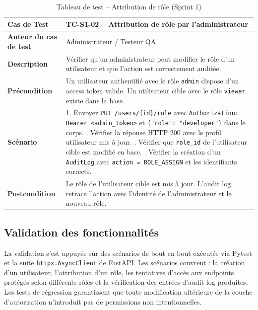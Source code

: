 \begin{table}[H]
\centering
\caption{Tableau de test -- Attribution de rôle (Sprint 1)}
\label{tab:test-sprint1-rbac}
\small
\renewcommand{\arraystretch}{1.3}
\begin{tabularx}{\textwidth}{>{\bfseries}p{3.5cm} X}
\hline
Cas de Test & TC-S1-02 -- Attribution de rôle par l'administrateur \\
\hline
Auteur du cas de test & Administrateur / Testeur QA \\
\hline
Description & Vérifier qu'un administrateur peut modifier le rôle d'un utilisateur et que l'action est correctement auditée. \\
\hline
Précondition & Un utilisateur authentifié avec le rôle \texttt{admin} dispose d'un access token valide. Un utilisateur cible avec le rôle \texttt{viewer} existe dans la base. \\
\hline
Scénario &
1. Envoyer \texttt{PUT /users/\{id\}/role} avec \texttt{Authorization: Bearer <admin\_token>} et \texttt{\{"role": "developer"\}} dans le corps. \newline
2. Vérifier la réponse HTTP 200 avec le profil utilisateur mis à jour. \newline
3. Vérifier que \texttt{role\_id} de l'utilisateur cible est modifié en base. \newline
4. Vérifier la création d'un \texttt{AuditLog} avec \texttt{action = ROLE\_ASSIGN} et les identifiants corrects. \\
\hline
Postcondition & Le rôle de l'utilisateur cible est mis à jour. L'audit log retrace l'action avec l'identité de l'administrateur et le nouveau rôle. \\
\hline
\end{tabularx}
\end{table}

\subsection{Validation des fonctionnalités}
La validation s'est appuyée sur des scénarios de bout en bout exécutés via Pytest et la suite \texttt{httpx.AsyncClient} de FastAPI. Les scénarios couvrent : la création d'un utilisateur, l'attribution d'un rôle, les tentatives d'accès aux endpoints protégés selon différents rôles et la vérification des entrées d'audit log produites. Les tests de régression garantissent que toute modification ultérieure de la couche d'autorisation n'introduit pas de permissions non intentionnelles.


